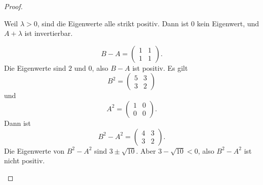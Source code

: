 \begin{proof}
\begin{parts}
		Weil $\lambda>0$, sind die Eigenwerte alle strikt positiv. Dann ist $0$ kein Eigenwert, und $A +\lambda$ ist invertierbar.
\item 
	\[
		B-A=\begin{pmatrix} 1 & 1 \\ 1 & 1 \end{pmatrix} 
	.\] 
	Die Eigenwerte sind $2$ und $0$, also $B-A$ ist positiv. Es gilt
	\[
		B^2=\begin{pmatrix} 5 & 3 \\ 3 & 2 \end{pmatrix} 
	\]
	und
	\[
		A^2=\begin{pmatrix} 1 & 0 \\ 0 & 0 \end{pmatrix} 
	.\] 
	Dann ist
	\[
		B^2-A^2=\begin{pmatrix} 4 & 3 \\ 3 & 2 \end{pmatrix} 
	.\] 
	Die Eigenwerte von $B^2-A^2$ sind $3\pm \sqrt{10} $. Aber $3-\sqrt{10} <0$, also $B^2-A^2$ ist nicht positiv.\qedhere
	\end{parts}
\end{proof}
